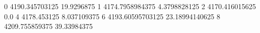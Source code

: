 0 4190.345703125 19.9296875
1 4174.7958984375 4.3798828125
2 4170.416015625 0.0
4 4178.453125 8.037109375
6 4193.60595703125 23.18994140625
8 4209.755859375 39.33984375
